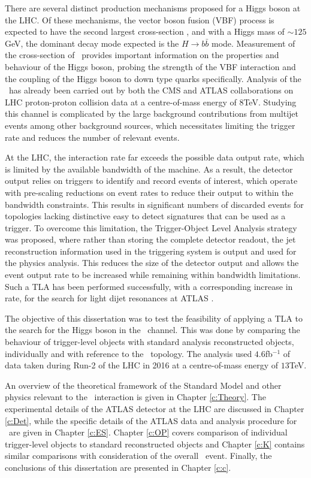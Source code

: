 There are several distinct production mechanisms proposed for a Higgs boson at the LHC. Of these mechanisms, the vector boson fusion (VBF) process is expected to have the second largest cross-section \cite{LHCHiggsCS}, and with a Higgs mass of $\sim125$GeV, the dominant decay mode expected \cite{HDECAY} is the $H\rightarrow b\bar{b}$ mode. Measurement of the cross-section of \VBFHBB\ provides important information on the properties and behaviour of the Higgs boson, probing the strength of the VBF interaction and the coupling of the Higgs boson to down type quarks specifically. Analysis of the \VBFHBB\ has already been carried out by both the CMS \cite{cmsvbfhbb} and ATLAS \cite{VBFHbb8tev} collaborations on LHC proton-proton collision data at a centre-of-mass energy of $8$TeV. Studying this channel is complicated by the large background contributions from multijet events among other background sources, which necessitates limiting the trigger rate and reduces the number of relevant events.

At the LHC, the interaction rate far exceeds the possible data output rate, which is limited by the available bandwidth of the machine. As a result, the detector output relies on triggers to identify and record events of interest, which operate with pre-scaling reductions on event rates to reduce their output to within the bandwidth constraints. This results in significant numbers of discarded events for topologies lacking distinctive easy to detect signatures that can be used as a trigger. To overcome this limitation, the Trigger-Object Level Analysis strategy was proposed, where rather than storing the complete detector readout, the jet reconstruction information used in the triggering system is output and used for the physics analysis. This reduces the size of the detector output and allows the event output rate to be increased while remaining within bandwidth limitations. Such a TLA has been performed successfully, with a corresponding increase in rate, for the search for light dijet resonances at ATLAS \cite{tla}.

The objective of this dissertation was to test the feasibility of applying a TLA to the search for the Higgs boson in the \VBFHBB\ channel. This was done by comparing the behaviour of trigger-level objects with standard analysis reconstructed objects, individually and with reference to the \VBFHBB\ topology. The analysis used $4.6$fb$^{-1}$ of data taken during Run-2 of the LHC in 2016 at a centre-of-mass energy of $13$TeV.

\newpage
An overview of the theoretical framework of the Standard Model and other physics relevant to the \VBFHBB\ interaction is given in Chapter \ref{c:Theory}. The experimental details of the ATLAS detector at the LHC are discussed in Chapter \ref{c:Det}, while the specific details of the ATLAS data and analysis procedure for \VBFHBB\ are given in Chapter \ref{c:ES}. Chapter \ref{c:OP} covers comparison of individual trigger-level objects to standard reconstructed objects and Chapter \ref{c:K} contains similar comparisons with consideration of the overall \VBFHBB\ event. Finally, the conclusions of this dissertation are presented in Chapter \ref{c:c}.


